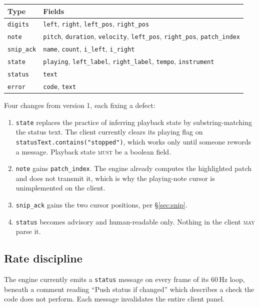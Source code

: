 \documentclass[11pt,a4paper]{article}
\newcommand{\MUST}{\textsc{must}}
\newcommand{\MAY}{\textsc{may}}
\theoremstyle{definition}
\theoremstyle{plain}
\theoremstyle{remark}
\begin{document}
\begin{center}
\begin{tabular}{ll}
\toprule
\textbf{Type} & \textbf{Fields} \\
\midrule
\texttt{digits}    & \texttt{left}, \texttt{right}, \texttt{left\_pos}, \texttt{right\_pos} \\
\texttt{note}      & \texttt{pitch}, \texttt{duration}, \texttt{velocity}, \texttt{left\_pos}, \texttt{right\_pos}, \texttt{patch\_index} \\
\texttt{snip\_ack} & \texttt{name}, \texttt{count}, \texttt{i\_left}, \texttt{i\_right} \\
\texttt{state}     & \texttt{playing}, \texttt{left\_label}, \texttt{right\_label}, \texttt{tempo}, \texttt{instrument} \\
\texttt{status}    & \texttt{text} \\
\texttt{error}     & \texttt{code}, \texttt{text} \\
\bottomrule
\end{tabular}
\end{center}

Four changes from version 1, each fixing a defect:

\begin{enumerate}[leftmargin=*]
\item \texttt{state} replaces the practice of inferring playback state by substring-matching the
      status text. The client currently clears its playing flag on
      \texttt{statusText.contains("stopped")}, which works only until someone rewords a message.
      Playback state \MUST{} be a boolean field.
\item \texttt{note} gains \texttt{patch\_index}. The engine already computes the highlighted patch
      and does not transmit it, which is why the playing-note cursor is unimplemented on the client.
\item \texttt{snip\_ack} gains the two cursor positions, per \S\ref{sec:snip}.
\item \texttt{status} becomes advisory and human-readable only. Nothing in the client \MAY{}
      parse it.
\end{enumerate}

\subsection{Rate discipline}

The engine currently emits a \texttt{status} message on every frame of its 60\,Hz loop, beneath a
comment reading ``Push status if changed'' which describes a check the code does not perform. Each
message invalidates the entire client panel.
\end{document}
